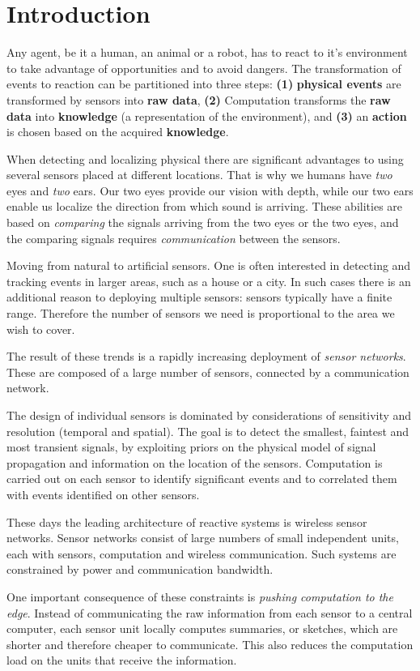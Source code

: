 \section{Introduction}
Any agent, be it a human, an animal or a robot, has to react to it's
environment to take advantage of opportunities and to avoid
dangers. The transformation of events to reaction can be partitioned
into three steps: {\bf(1)} {\bf physical events} are transformed by
sensors into {\bf raw data}, {\bf (2)} Computation transforms the {\bf
  raw data} into {\bf knowledge} (a representation of the
environment), and {\bf (3)} an {\bf action} is chosen based on the
acquired {\bf knowledge}.


When detecting and localizing physical there are significant
advantages to using several sensors placed at different
locations. That is why we humans have {\em two} eyes and {\em two}
ears. Our two eyes provide our vision with depth, while our two ears
enable us localize the direction from which sound is arriving. These
abilities are based on {\em comparing} the signals arriving from the
two eyes or the two eyes, and the comparing signals requires {\em
  communication} between the sensors.

Moving from natural to artificial sensors. One is often interested in
detecting and tracking events in larger areas, such as a house or a
city. In such cases there is an additional reason to deploying
multiple sensors: sensors typically have a finite range. Therefore the
number of sensors we need is proportional to the area we wish to
cover.

The result of these trends is a rapidly increasing deployment of
{\em  sensor networks}. These are composed
of a large number of sensors, connected by a communication network.

The design of individual sensors is dominated by considerations of
sensitivity and resolution (temporal and spatial).  The goal is to
detect the smallest, faintest and most transient signals, by
exploiting priors on the physical model of signal propagation and
information on the location of the sensors. Computation is carried out
on each sensor to identify significant events and to correlated them
with events identified on other sensors.

These days the leading architecture of reactive systems is wireless
sensor networks. Sensor networks consist of large numbers of small
independent units, each with sensors, computation and wireless
communication. Such systems are constrained by power and communication
bandwidth.

One important consequence of these constraints is {\em pushing
  computation to the edge}. Instead of communicating the raw
information from each sensor to a central computer, each sensor unit
locally computes summaries, or sketches, which are shorter and
therefore cheaper to communicate. This also reduces the computation
load on the units that receive the information.

